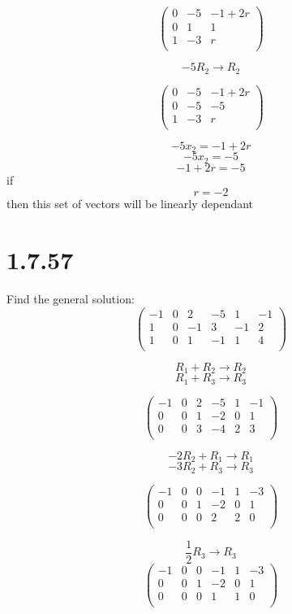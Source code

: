 \documentclass{article}
\begin{document}
\[
	\left(
		\begin{array}{ccc}
			0&	-5&	-1+2r\\
			0&	1&	1\\
			1&	-3&	r\\
		\end{array}
	\right)
\]

\[ -5R_{2} \rightarrow R_{2} \]

\[
	\left(
		\begin{array}{ccc}
			0&	-5&	-1+2r\\
			0&	-5&	-5\\
			1&	-3&	r\\
		\end{array}
	\right)
\]

\[	-5x_{2} = -1+2r		\]
\[	-5x_{2} = -5		\]
\[	-1+2r = -5			\]
if
\[	r = -2				\]
then this set of vectors will be linearly dependant
\newpage

\section*{1.7.57}

Find the general solution:
\[
	\left(
		\begin{array}{cccccc}
			-1&	0&	2&	-5&	1&	-1\\
			1&	0&	-1&	3&	-1&	2\\
			1&	0&	1&	-1&	1&	4\\
		\end{array}
	\right)
\]

\[	R_{1} + R_{2} \rightarrow R_{2}		\]
\[	R_{1} + R_{3} \rightarrow R_{3}		\]

\[
	\left(
		\begin{array}{cccccc}
			-1&	0&	2&	-5&	1&	-1\\
			0&	0&	1&	-2&	0&	1\\
			0&	0&	3&	-4&	2&	3\\
		\end{array}
	\right)
\]

\[	-2R_{2} + R_{1} \rightarrow R_{1}	\]
\[	-3R_{2} + R_{3} \rightarrow R_{3}	\]

\[
	\left(
		\begin{array}{cccccc}
			-1&	0&	0&	-1&	1&	-3\\
			0&	0&	1&	-2&	0&	1\\
			0&	0&	0&	2&	2&	0\\
		\end{array}
	\right)
\]

\[	\frac{1}{2} R_{3} \rightarrow R_{3}		\]
\[
	\left(
		\begin{array}{cccccc}
			-1&	0&	0&	-1&	1&	-3\\
			0&	0&	1&	-2&	0&	1\\
			0&	0&	0&	1&	1&	0\\
		\end{array}
	\right)
\]
\end{document}
